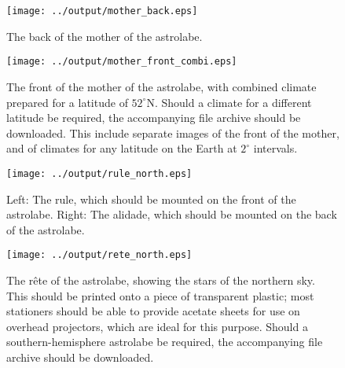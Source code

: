 \documentclass[a4paper,onecolumn,10pt]{article}
\begin{document}
\newpage

\begin{figure}
\centerline{\texttt{[image: ../output/mother\_back.eps]}}
\caption{The back of the mother of the astrolabe.}
\label{mother_back}
\end{figure}

\begin{figure}
\centerline{\texttt{[image: ../output/mother\_front\_combi.eps]}}
\caption{The front of the mother of the astrolabe, with combined climate prepared for a latitude of $52^\circ$N. Should a climate for a different latitude be required, the accompanying file archive should be downloaded. This include separate images of the front of the mother, and of climates for any latitude on the Earth at $2^\circ$ intervals.}
\label{mother_front}
\end{figure}

\begin{figure}
\centerline{\texttt{[image: ../output/rule\_north.eps]}}
\caption{Left: The rule, which should be mounted on the front of the astrolabe. Right: The alidade, which should be mounted on the back of the astrolabe.}
\label{rule}
\end{figure}

\begin{figure}
\centerline{\texttt{[image: ../output/rete\_north.eps]}}
\caption{The r\^ete of the astrolabe, showing the stars of the northern sky. This should be printed onto a piece of transparent plastic; most stationers should be able to provide acetate sheets for use on overhead projectors, which are ideal for this purpose. Should a southern-hemisphere astrolabe be required, the accompanying file archive should be downloaded.}
\label{rete}
\end{figure}
\end{document}
